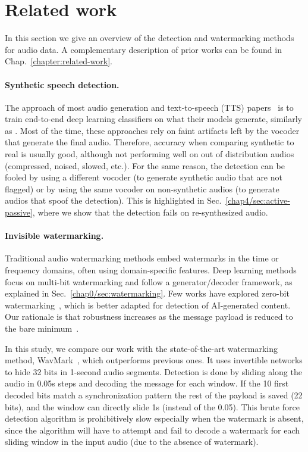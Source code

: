 
\section{Related work}

In this section we give an overview of the detection and watermarking methods for audio data. 
A complementary description of prior works can be found in Chap.~\ref{chapter:related-work}.

\paragraph{Synthetic speech detection.}
The approach of most audio generation and text-to-speech (\Gls*{TTS}) papers~\citep{Borsos2022AudioLMAL, Kharitonov2023SpeakRA, borsos2023soundstorm, le2023voicebox} is to train end-to-end deep learning classifiers on what their models generate, similarly as \citet{zhang2017investigation}.
Most of the time, these approaches rely on faint artifacts left by the vocoder that generate the final audio. 
Therefore, accuracy when comparing synthetic to real is usually good, although not performing well on out of distribution audios (compressed, noised, slowed, etc.).
For the same reason, the detection can be fooled by using a different vocoder (to generate synthetic audio that are not flagged) or by using the same vocoder on non-synthetic audios (to generate audios that spoof the detection).
This is highlighted in Sec.~\ref{chap4/sec:active-passive}, where we show that the detection fails on re-synthesized audio.

\paragraph{Invisible watermarking.} 
Traditional audio watermarking methods embed watermarks in the time or frequency domains, often using domain-specific features. 
Deep learning methods focus on multi-bit watermarking and follow a generator/decoder framework, as explained in Sec.~\ref{chap0/sec:watermarking}.
Few works have explored zero-bit watermarking~\citep{wu2023adversarial, juvela2023collaborative}, which is better adapted for detection of AI-generated content.
Our rationale is that robustness increases as the message payload is reduced to the bare minimum~\citep{furon2007constructive}.

In this study, we compare our work with the state-of-the-art watermarking method, WavMark~\citep{chen2023wavmark}, which outperforms previous ones. 
It uses invertible networks to hide 32 bits in 1-second audio segments.
Detection is done by sliding along the audio in 0.05s steps and decoding the message for each window.
If the 10 first decoded bits match a synchronization pattern the rest of the payload is saved (22 bits), and the window can directly slide 1s (instead of the 0.05).
This brute force detection algorithm is prohibitively slow especially when the watermark is absent, since the algorithm will have to attempt and fail to decode a watermark for each sliding window in the input audio (due to the absence of watermark).
